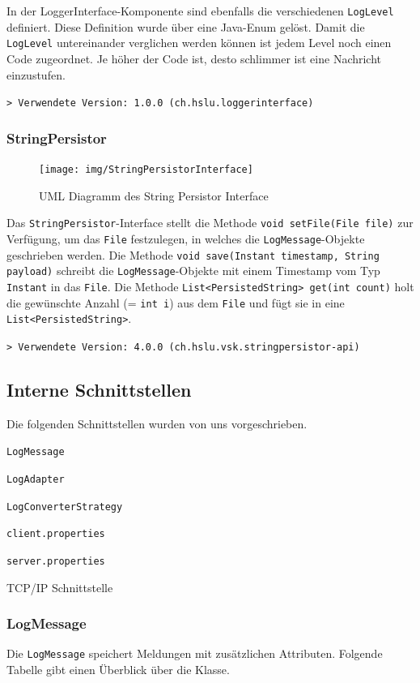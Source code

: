 \documentclass[12pt,a4paper,twosided]{scrartcl}
\newenvironment{tight_enumerate}{
\begin{enumerate}
	\setlength{\itemsep}{0pt}
	\setlength{\parskip}{0pt}
}{\end{enumerate}}
\begin{document}
In der LoggerInterface-Komponente sind ebenfalls die verschiedenen \texttt{LogLevel} definiert.
Diese Definition wurde über eine Java-Enum gelöst. Damit die \texttt{LogLevel} untereinander
verglichen werden können ist jedem Level noch einen Code zugeordnet. Je höher der Code
ist, desto schlimmer ist eine Nachricht einzustufen.

\texttt{> Verwendete Version: 1.0.0 (ch.hslu.loggerinterface)}

\subsubsection{StringPersistor}
\begin{figure}[h]
	\centering
	\texttt{[image: img/StringPersistorInterface]}
	\caption{UML Diagramm des String Persistor Interface}
	\label{fig:stringpersistorinterface}
\end{figure}

Das \texttt{StringPersistor}-Interface stellt die Methode \texttt{void setFile(File file)} zur Verfügung, um das \texttt{File} festzulegen, in welches die \texttt{LogMessage}-Objekte geschrieben werden. Die Methode \texttt{void save(Instant timestamp, String payload)} schreibt die \texttt{LogMessage}-Objekte mit einem Timestamp vom Typ \texttt{Instant} in das \texttt{File}. Die Methode \texttt{List<PersistedString> get(int count)} holt die gewünschte Anzahl (= \texttt{int i}) aus dem \texttt{File} und fügt sie in eine \texttt{List<PersistedString>}.

\texttt{> Verwendete Version: 4.0.0 (ch.hslu.vsk.stringpersistor-api)}

\subsection{Interne Schnittstellen}
Die folgenden Schnittstellen wurden von uns vorgeschrieben.

\begin{tight_enumerate}	
	\item \texttt{LogMessage}
	\item \texttt{LogAdapter}
	\item \texttt{LogConverterStrategy}
	\item \texttt{client.properties}
	\item \texttt{server.properties}
	\item TCP/IP Schnittstelle
\end{tight_enumerate}

\subsubsection{LogMessage}
Die \texttt{LogMessage} speichert Meldungen mit zusätzlichen Attributen. Folgende Tabelle gibt einen Überblick über die Klasse.
\end{document}
